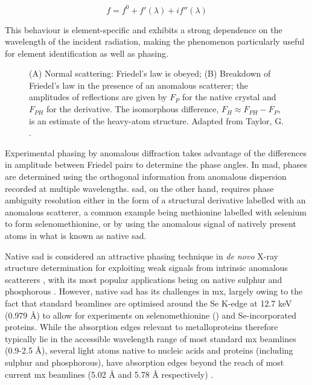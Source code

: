 \begin{equation}
    f=f^0+f'(\lambda)+if''(\lambda) \label{total scattering}
\end{equation}

This behaviour is element-specific and exhibits a strong dependence on the wavelength of the incident radiation, making the phenomenon particularly useful for element identification as well as phasing.

\begin{figure}
    \centering
    
    \caption{(A) Normal scattering: Friedel's law is obeyed; (B) Breakdown of Friedel's law in the presence of an anomalous scatterer; the amplitudes of reflections are given by $F_P$ for the native crystal and $F_{PH}$ for the derivative. The isomorphous difference, $F_H \approx F_{PH} - F_P$, is an estimate of the heavy-atom structure. Adapted from Taylor, G. \cite{Taylor2003}.}
    \label{Breakdown of Friedel's law}
\end{figure}

Experimental phasing by anomalous diffraction takes advantage of the differences in amplitude between Friedel pairs to determine the phase angles. In \ac{mad}, phases are determined using the orthogonal information from anomalous dispersion recorded at multiple wavelengths. \Ac{sad}, on the other hand, requires phase ambiguity resolution either in the form of a structural derivative labelled with an anomalous scatterer, a common example being methionine labelled with selenium to form selenomethionine, or by using the anomalous signal of natively present atoms in what is known as native \ac{sad}.

Native \ac{sad} is considered an attractive phasing technique in  \textit{de novo} X-ray structure determination %
for exploiting weak signals from intrinsic anomalous scatterers \cite{Basu2019}, with its most popular applications being on native sulphur and phosphorous \cite{Karasawa2022}. However, native \ac{sad} has its challenges in \ac{mx}, largely owing to the fact that standard beamlines are optimised around the Se K-edge at 12.7 \unit{keV} (0.979 Å) to allow for experiments on selenomethionine () and Se-incorporated proteins.
While the absorption edges relevant to metalloproteins therefore typically lie in the accessible wavelength range of most standard \ac{mx} beamlines (0.9-2.5 Å), %
several light atoms native to nucleic acids and proteins (including sulphur and phosphorous), have absorption edges beyond the reach of most current \ac{mx} beamlines (5.02 Å and 5.78 Å respectively) \cite{Olieric2016}. 

